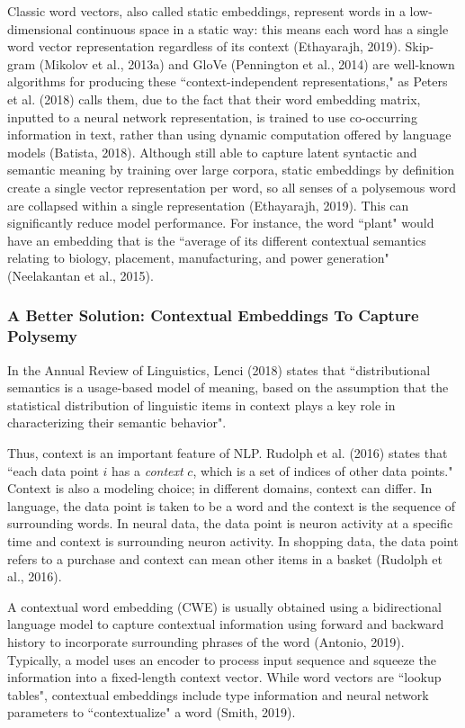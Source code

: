 Classic word vectors, also called static embeddings, represent words in a low-dimensional continuous space in a static way: this means each word has a single word vector representation regardless of its context (Ethayarajh, 2019). Skip-gram (Mikolov et al., 2013a) and GloVe (Pennington et al., 2014) are well-known algorithms for producing these ``context-independent representations," as Peters et al. (2018) calls them, due to the fact that their word embedding matrix, inputted to a neural network representation, is trained to use co-occurring information in text, rather than using dynamic computation offered by language models (Batista, 2018). Although still able to capture latent syntactic and semantic meaning by training over large corpora, static embeddings by definition create a single vector representation per word, so all senses of a polysemous word are collapsed within a single representation (Ethayarajh, 2019). This can significantly reduce model performance. For instance, the word ``plant" would have an embedding that is the ``average of its different contextual semantics relating to biology, placement, manufacturing, and power generation" (Neelakantan et al., 2015). 

\subsubsection{A Better Solution: Contextual Embeddings To Capture Polysemy}

In the Annual Review of Linguistics, Lenci (2018) states that ``distributional semantics is a usage-based model of meaning, based on the assumption that the statistical distribution of linguistic items in context plays a key role in characterizing their semantic behavior".

Thus, context is an important feature of NLP. Rudolph et al. (2016) states that ``each data point $i$ has a \emph{context} $c$, which is a set of indices of other data points." Context is also a modeling choice; in different domains, context can differ. In language, the data point is taken to be a word and the context is the sequence of surrounding words. In neural data, the data point is neuron activity at a specific time and context is surrounding neuron activity. In shopping data, the data point refers to a purchase and context can mean other items in a basket (Rudolph et al., 2016). 

A contextual word embedding (CWE) is usually obtained using a bidirectional language model to capture contextual information using forward and backward history to incorporate surrounding phrases of the word (Antonio, 2019). Typically, a model uses an encoder to process input sequence and squeeze the information into a fixed-length context vector. While word vectors are ``lookup tables", contextual embeddings include type information and neural network parameters to ``contextualize" a word (Smith, 2019). 

